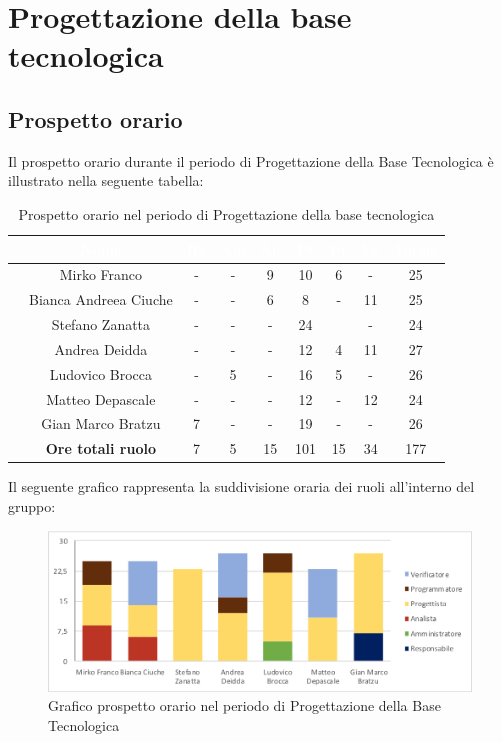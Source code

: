 \newpage

\section{Progettazione della base tecnologica}
\subsection{Prospetto orario}
Il prospetto orario durante il periodo di Progettazione della Base Tecnologica è illustrato nella seguente tabella:

\begin{table}[ht]
	\begin{center}
		\begin{tabular}{ccccccccc}
			\rowcolor{coolblack}
			\hline
			& \textcolor{white}{Nome} & \textcolor{white}{Re} & \textcolor{white}{Am} & \textcolor{white}{An} & \textcolor{white}{Pt} &\textcolor{white}{Pr} & \textcolor{white}{Ve} & \textcolor{white}{Totale} \\
			\hline
			&Mirko Franco & - & - & 9 & 10 & 6 & - & 25  \\
			&Bianca Andreea Ciuche & -& - & 6 & 8 & - & 11 & 25 \\
			&Stefano Zanatta &- & - & - & 24 &  & - & 24 \\
			&Andrea Deidda &  -& - & - & 12 & 4 & 11 & 27 \\
			&Ludovico Brocca & -& 5 & - & 16 & 5 & - & 26 \\
			&Matteo Depascale & -& - & - & 12 & - & 12 & 24 \\
			&Gian Marco Bratzu & 7& - & - & 19 & - & - & 26 \\
			\hline
			&\textbf{Ore totali ruolo} & 7 & 5 & 15 & 101 & 15 & 34 & 177 \\
		\end{tabular}
		\caption{Prospetto orario nel periodo di Progettazione della base tecnologica}
	\end{center}
\end{table}

Il seguente grafico rappresenta la suddivisione oraria dei ruoli all'interno del gruppo:
\begin{figure}[!ht]
	\begin{center}
		\includegraphics[scale=0.85]{images/grafoProgettazioneTecnologica.png}
		\caption{Grafico prospetto orario nel periodo di Progettazione della Base Tecnologica}
	\end{center}
\end{figure}
\newpage
